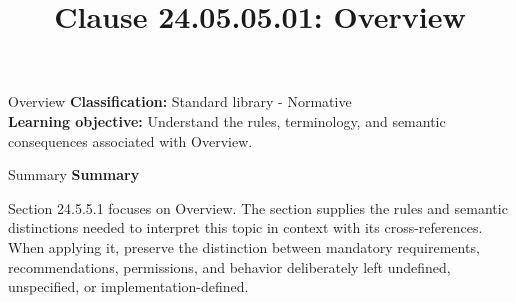 \documentclass[10pt,letterpaper]{article}
\title{Clause 24.05.05.01: Overview}
\author{}
\date{}
\begin{document}
\maketitle
\begin{CornellOverviewBox}{Overview}
\textbf{Classification:} Standard library - Normative\\[2pt]
\textbf{Learning objective:} Understand the rules, terminology, and semantic consequences associated with Overview.
\end{CornellOverviewBox}\begin{CornellSummaryBox}{Summary}
{\sffamily\bfseries\color{Accent} Summary}\par\vspace{3pt}Section 24.5.5.1 focuses on Overview. The section supplies the rules and semantic distinctions needed to interpret this topic in context with its cross-references. When applying it, preserve the distinction between mandatory requirements, recommendations, permissions, and behavior deliberately left undefined, unspecified, or implementation-defined.
\end{CornellSummaryBox}
\end{document}
